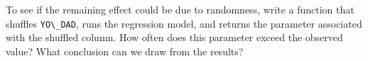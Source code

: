 To see if the remaining effect could be due to randomness, write a
function that shuffles \passthrough{\lstinline!YO\_DAD!}, runs the
regression model, and returns the parameter associated with the shuffled
column. How often does this parameter exceed the observed value? What
conclusion can we draw from the results?

